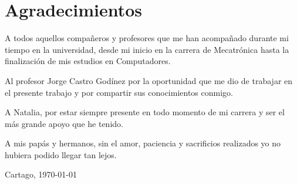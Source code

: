 \chapter*{Agradecimientos}
\thispagestyle{empty}


A todos aquellos compañeros y profesores que me han acompañado durante
mi tiempo en la universidad, desde mi inicio en la carrera de Mecatrónica
hasta la finalización de mis estudios en Computadores. 

Al profesor Jorge Castro Godínez por la oportunidad que me dio de trabajar
en el presente trabajo y por compartir sus conocimientos conmigo.

A Natalia, por estar siempre presente en todo momento de mi carrera
y ser el más grande apoyo que he tenido.

A mis papás y hermanos, sin el amor, paciencia y sacrificios realizados
yo no hubiera podido llegar tan lejos.

\vspace*{1cm}

\thesisAuthor

Cartago, \today

\cleardoublepage

